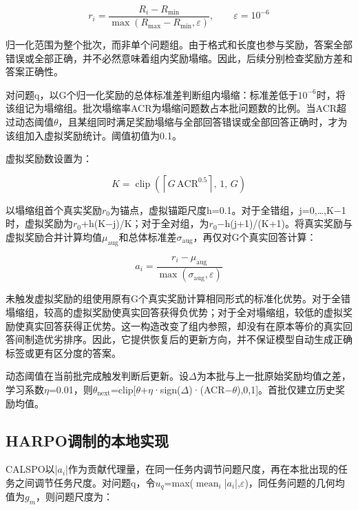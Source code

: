 \documentclass[UTF8,a4paper,11pt,fontset=windows]{ctexart}
\begin{document}
\begin{equation*}
r_i=\frac{R_i-R_{\min}}{\max(R_{\max}-R_{\min},\varepsilon)},\qquad\varepsilon=10^{-6}
\end{equation*}

归一化范围为整个批次，而非单个问题组。由于格式和长度也参与奖励，答案全部错误或全部正确，并不必然意味着组内奖励塌缩。因此，后续分别检查奖励方差和答案正确性。

对问题q，以G个归一化奖励的总体标准差判断组内塌缩：标准差低于$10^{-6}$时，将该组记为塌缩组。批次塌缩率ACR为塌缩问题数占本批问题数的比例。当ACR超过动态阈值$\theta$，且某组同时满足奖励塌缩与全部回答错误或全部回答正确时，才为该组加入虚拟奖励统计。阈值初值为0.1。

虚拟奖励数设置为：

\begin{equation*}
K=\operatorname{clip}\!\left(\left\lceil G\,\mathrm{ACR}^{0.5}\right\rceil,\,1,\,G\right)
\end{equation*}

以塌缩组首个真实奖励$r_0$为锚点，虚拟锚距尺度h=0.1。对于全错组，j=0,…,K$-$1时，虚拟奖励为$r_0$+h(K$-$j)/K；对于全对组，为$r_0$$-$h(j+1)/(K+1)。将真实奖励与虚拟奖励合并计算均值$\mu_{\mathrm{aug}}$和总体标准差$\sigma_{\mathrm{aug}}$，再仅对G个真实回答计算：

\begin{equation*}
a_i=\frac{r_i-\mu_{\mathrm{aug}}}{\max(\sigma_{\mathrm{aug}},\varepsilon)}
\end{equation*}

未触发虚拟奖励的组使用原有G个真实奖励计算相同形式的标准化优势。对于全错塌缩组，较高的虚拟奖励使真实回答获得负优势；对于全对塌缩组，较低的虚拟奖励使真实回答获得正优势。这一构造改变了组内参照，却没有在原本等价的真实回答间制造优劣排序。因此，它提供恢复后的更新方向，并不保证模型自动生成正确标签或更有区分度的答案。

动态阈值在当前批完成触发判断后更新。设$\Delta$为本批与上一批原始奖励均值之差，学习系数$\eta$=0.01，则$\theta_{\mathrm{next}}$=clip[$\theta$+$\eta$·sign($\Delta$)·(ACR$-$$\theta$),0,1]。首批仅建立历史奖励均值。

\subsection{HARPO调制的本地实现}

CALSPO以|$a_i$|作为贡献代理量，在同一任务内调节问题尺度，再在本批出现的任务之间调节任务尺度。对问题q，令$u_q$=max($\operatorname{mean}_i$|$a_i$|,$\varepsilon$)，同任务问题的几何均值为$g_m$，则问题尺度为：
\end{document}
